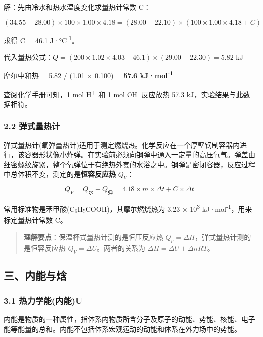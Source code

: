 解：先由冷水和热水温度变化求量热计常数 C：

\[(34.55 - 28.00) \times 100 \times 1.00 \times 4.18 = (28.00 - 22.10) \times (100 \times 1.00 \times 4.18 + C)\]

求得 C = 46.1 J·°C\textsuperscript{-1}。

代入量热公式：\(Q = (200 \times 1.02 \times 4.03 + 46.1) \times (29.00 - 22.30) = 5.82\) kJ

摩尔中和热 = 5.82 / (1.01 × 0.100) = \textbf{57.6 kJ·mol\textsuperscript{-1}}

查阅化学手册可知，1 mol H\textsuperscript{+} 和 1 mol OH\textsuperscript{-} 反应放热 57.3 kJ，实验结果与此数据相符。

\subsubsection{2.2 弹式量热计}\label{ux5f39ux5f0fux91cfux70edux8ba1}

弹式量热计(氧弹量热计)适用于测定燃烧热。化学反应在一个厚壁钢制容器内进行，该容器形状像小炸弹。在实验前必须向钢弹中通入一定量的高压氧气。弹盖由细密螺纹旋紧，整个氧弹位于有绝热外套的水浴之中。钢弹是密闭容器，反应过程中总体积不变，测定的是\textbf{恒容反应热} \(Q_V\)：

\[
Q_V = Q_{\text{水}} + Q_{\text{弹}} = 4.18 \times m \times \Delta t + C \times \Delta t
\]

常用标准物是苯甲酸(C\textsubscript{6}H\textsubscript{5}COOH)，其摩尔燃烧热为 3.23 × 10\textsuperscript{3} kJ·mol\textsuperscript{-1}，用来标定量热计常数 C。

\begin{quote}
\textbf{理解要点}：保温杯式量热计测的是恒压反应热 \(Q_p = \Delta H\)，弹式量热计测的是恒容反应热 \(Q_V = \Delta U\)。两者的关系为 \(\Delta H = \Delta U + \Delta nRT\)。
\end{quote}

\subsection{三、内能与焓}\label{ux4e09ux5185ux80fdux4e0eux7113}

\subsubsection{3.1 热力学能(内能)U}\label{ux70edux529bux5b66ux80fdux5185ux80fdu}

内能是物质的一种属性，指体系内物质所含分子及原子的动能、势能、核能、电子能等能量的总和。内能不包括体系宏观运动的动能和体系在外力场中的势能。

